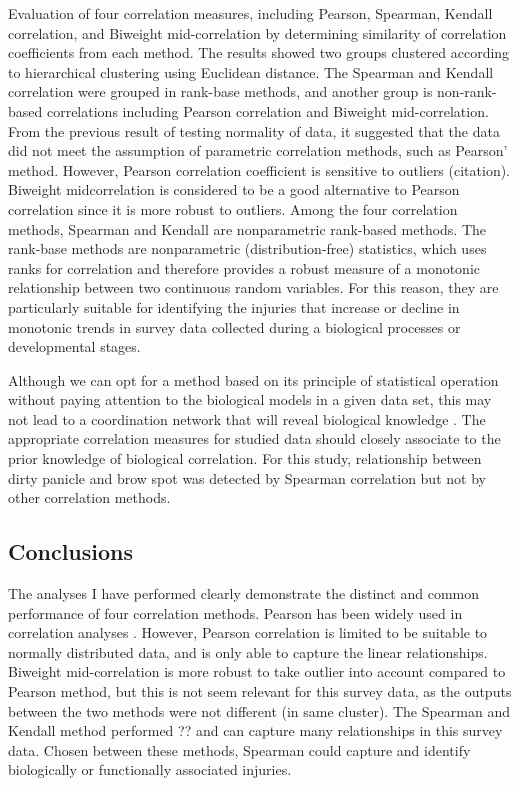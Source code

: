 Evaluation of four correlation measures, including Pearson, Spearman, Kendall correlation, and Biweight mid-correlation by determining similarity of correlation coefficients from each method. The results showed two groups clustered according to hierarchical clustering using Euclidean distance. The Spearman and Kendall correlation were grouped in rank-base methods, and another group is non-rank-based correlations including Pearson correlation and Biweight mid-correlation. From the previous result of testing normality of data, it suggested that the data did not meet the assumption of parametric correlation methods, such as Pearson' method. However, Pearson correlation coefficient is sensitive to outliers (citation). Biweight midcorrelation is considered to be a good alternative to Pearson correlation since it is more robust to outliers\citep{Wilcox_2012_Introduction}. Among the four correlation methods, Spearman and Kendall are nonparametric rank-based methods. The rank-base methods are nonparametric (distribution-free) statistics, which uses ranks for correlation and therefore provides a robust measure of a monotonic relationship between two continuous random variables. For this reason, they are particularly suitable for identifying the injuries that increase or decline in monotonic trends in survey data collected during a biological processes or developmental stages.

Although we can opt for a method based on its principle of statistical operation without paying attention to the biological models in a given data set, this may not lead to a coordination network that will reveal biological knowledge \citep{Kumari_2012_Evaluation}. The appropriate correlation measures for studied data should closely associate to the prior knowledge of biological correlation. For this study, relationship between dirty panicle and brow spot was detected by Spearman correlation but not by other correlation methods.

\subsection{Conclusions}

The analyses I have performed clearly demonstrate the distinct and common performance of four correlation methods. Pearson has been widely used in correlation analyses \citep{Zhang_2005_General}. However, Pearson correlation is limited to be suitable to normally distributed data, and is only able to capture the linear relationships. Biweight mid-correlation is more robust to  take outlier  into account compared to Pearson method, but this is not seem relevant for this survey data, as the outputs between the two methods were not different (in same cluster). The Spearman and Kendall method performed ?? and can capture many relationships in this survey data. Chosen between these methods, Spearman could capture and identify biologically or functionally associated injuries.

